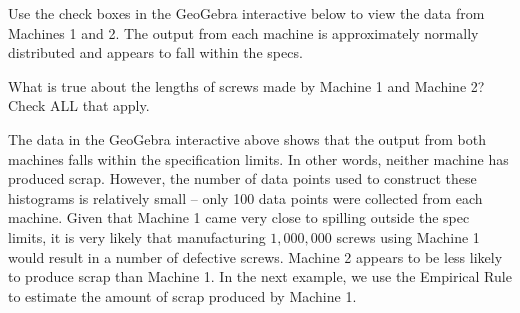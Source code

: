 \documentclass{ximera}
\begin{document}
Use the check boxes in the GeoGebra interactive below to view the data from Machines 1 and 2.  The output from each machine is approximately normally distributed and appears to fall within the specs.  

\begin{onlineOnly}
\begin{center} 
\end{center}
\end{onlineOnly}

\begin{question}\label{quest:compareMachines}
    What is true about the lengths of screws made by Machine 1 and Machine 2?  Check ALL that apply.
    \begin{selectAll}
            \end{selectAll}
\end{question}

The data in the GeoGebra interactive above shows that the output from both machines falls within the specification limits.  In other words, neither machine has produced scrap.  However, the number of data points used to construct these histograms is relatively small -- only 100 data points were collected from each machine.  Given that Machine 1 came very close to spilling outside the spec limits, it is very likely that manufacturing $1,000,000$ screws using Machine 1 would result in a number of defective screws.  Machine 2 appears to be less likely to produce scrap than Machine 1.  In the next example, we use the Empirical Rule to estimate the amount of scrap produced by Machine 1.    
\end{document}
